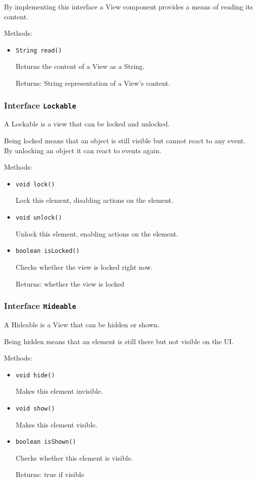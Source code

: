  By implementing this interface a View component provides a means of reading
 its content.

Methods:
\begin{itemize}
\item \texttt{String read()}

Returns the content of a View as a String.

Returns: String representation of a View's content.

\end{itemize}

\subsubsection{Interface \texttt{Lockable}}
\label{type:edu.kit.wavelength.client.view.api.Lockable}
A Lockable is a view that can be locked and unlocked.

 Being locked means that an object is still visible but cannot react to any event.
 By unlocking an object it can react to events again.

Methods:
\begin{itemize}
\item \texttt{void lock()}

Lock this element, disabling actions on the element.

\item \texttt{void unlock()}

Unlock this element, enabling actions on the element.

\item \texttt{boolean isLocked()}

Checks whether the view is locked right now.

Returns: whether the view is locked

\end{itemize}

\subsubsection{Interface \texttt{Hideable}}
\label{type:edu.kit.wavelength.client.view.api.Hideable}
A Hideable is a View that can be hidden or shown.
 
 Being hidden means that an element is still there but not visible on the UI.

Methods:
\begin{itemize}
\item \texttt{void hide()}

Makes this element invisible.

\item \texttt{void show()}

Makes this element visible.

\item \texttt{boolean isShown()}

Checks whether this element is visible.

Returns: true if visible

\end{itemize}

